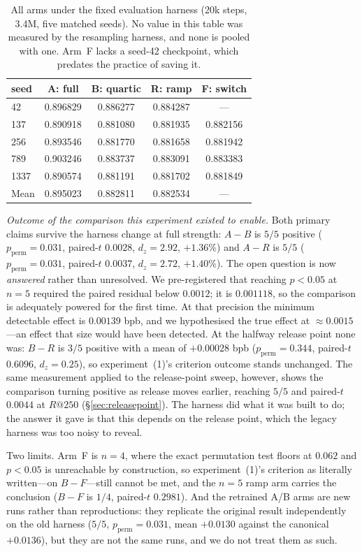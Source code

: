 \documentclass[11pt,a4paper]{article}
\begin{document}
\begin{table}[H]
\centering
\caption{All arms under the fixed evaluation harness (20k steps, 3.4M, five matched seeds). No value in this table was measured by the resampling harness, and none is pooled with one. Arm~F lacks a seed-42 checkpoint, which predates the practice of saving it.}
\label{tab:fixedeval}
\begin{tabular}{lcccc}
\toprule
seed & A: full & B: quartic & R: ramp & F: switch \\
\midrule
42   & 0.896829 & 0.886277 & 0.884287 & --- \\
137  & 0.890918 & 0.881080 & 0.881935 & 0.882156 \\
256  & 0.893546 & 0.881770 & 0.881658 & 0.881942 \\
789  & 0.903246 & 0.883737 & 0.883091 & 0.883383 \\
1337 & 0.890574 & 0.881191 & 0.881702 & 0.881849 \\
\midrule
Mean & 0.895023 & 0.882811 & 0.882534 & --- \\
\bottomrule
\end{tabular}
\end{table}

\emph{Outcome of the comparison this experiment existed to enable.} Both primary claims survive the harness change at full strength: $A-B$ is $5/5$ positive ($p_{\text{perm}}=0.031$, paired-$t$ $0.0028$, $d_z=2.92$, $+1.36$\%) and $A-R$ is $5/5$ ($p_{\text{perm}}=0.031$, paired-$t$ $0.0037$, $d_z=2.72$, $+1.40$\%). The open question is now \emph{answered} rather than unresolved. We pre-registered that reaching $p<0.05$ at $n=5$ required the paired residual below $0.0012$; it is $0.001118$, so the comparison is adequately powered for the first time. At that precision the minimum detectable effect is $0.00139$ bpb, and we hypothesised the true effect at ${\approx}0.0015$---an effect that size would have been detected. At the halfway release point none was: $B-R$ is $3/5$ positive with a mean of $+0.00028$ bpb ($p_{\text{perm}}=0.344$, paired-$t$ $0.6096$, $d_z=0.25$), so experiment~(1)'s criterion outcome stands unchanged. The same measurement applied to the release-point sweep, however, shows the comparison turning positive as release moves earlier, reaching $5/5$ and paired-$t$ $0.0044$ at $R@250$ (\S\ref{sec:releasepoint}). The harness did what it was built to do; the answer it gave is that this depends on the release point, which the legacy harness was too noisy to reveal.

Two limits. Arm~F is $n=4$, where the exact permutation test floors at $0.062$ and $p<0.05$ is unreachable by construction, so experiment~(1)'s criterion as literally written---on $B-F$---still cannot be met, and the $n=5$ ramp arm carries the conclusion ($B-F$ is $1/4$, paired-$t$ $0.2981$). And the retrained A/B arms are new runs rather than reproductions: they replicate the original result independently on the old harness ($5/5$, $p_{\text{perm}}=0.031$, mean $+0.0130$ against the canonical $+0.0136$), but they are not the same runs, and we do not treat them as such.
\end{document}

